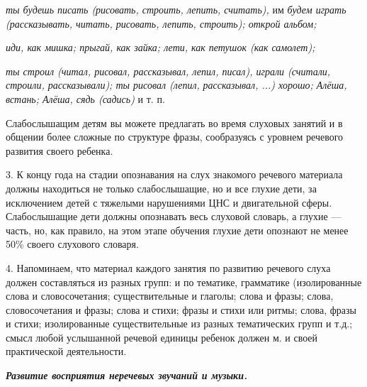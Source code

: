 \documentclass[a5paper]{book}
\renewcommand{\emph}[1]{\textit{#1}}
\begin{document}
\emph{ты будешь писать (рисовать, строить, лепить, считать),} им
\emph{будем играть (рассказывать, читать, рисовать, лепить, строить);
открой альбом;}

\emph{иди, как мишка; прыгай, как зайка; лети, как петушок (как
самолет);}

\emph{ты строил (читал, рисовал, рассказывал, лепил, писал), играли
(считали, строили, рассказывали); ты рисовал (лепил,} \emph{рассказывал,
...) хорошо; Алёша, встань; Алёша, сядь (садись)} и т. п.

Слабослышащим детям вы можете предлагать во время слуховых занятий и в
общении более сложные по структуре фразы, сообразуясь с уровнем речевого
развития своего ребенка.

3. К концу года на стадии опознавания на слух знакомого речевого
материала должны находиться не только слабослышащие, но и все глухие
дети, за исключением детей с тяжелыми нарушениями ЦНС и двигательной
сферы. Слабослышащие дети должны опознавать весь слуховой словарь, а
глухие --- часть, но, как правило, на этом этапе обучения глухие дети
опознают не менее 50\% своего слухового словаря.

4. Напоминаем, что материал каждого занятия по развитию речевого слуха
должен составляться из разных групп: и по тематике, грамматике
(изолированные слова и словосочетания; существительные и глаголы; слова
и фразы; слова, словосочетания и фразы; слова и стихи; фразы и стихи или
ритмы; слова, фразы и стихи; изолированные существительные из разных
тематических групп и т.д.; смысл любой услышанной речевой единицы
ребенок должен м. и своей практической деятельности.

\emph{\textbf{Развитие восприятия неречевых звучаний и музыки.}}
\end{document}
